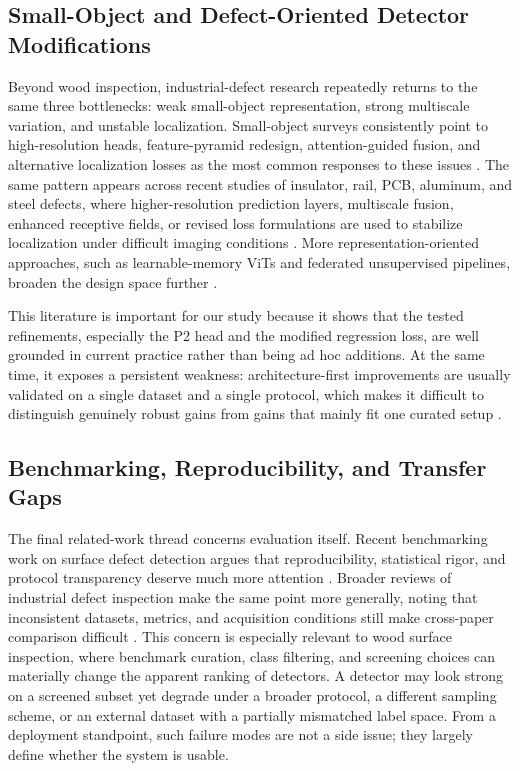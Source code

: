 \subsection{Small-Object and Defect-Oriented Detector Modifications}

Beyond wood inspection, industrial-defect research repeatedly returns to the same three bottlenecks: weak small-object representation, strong multiscale variation, and unstable localization. Small-object surveys consistently point to high-resolution heads, feature-pyramid redesign, attention-guided fusion, and alternative localization losses as the most common responses to these issues \citep{wei_2024_smallreview,hua_2025_smallsurvey}. The same pattern appears across recent studies of insulator, rail, PCB, aluminum, and steel defects, where higher-resolution prediction layers, multiscale fusion, enhanced receptive fields, or revised loss formulations are used to stabilize localization under difficult imaging conditions \citep{cmc_insulator_small,cmc_yolovsi,cmc_cg_yolov8,cmc_pcb_yolov8,cmc_aluminum_yolov8n,cmc_msese}. More representation-oriented approaches, such as learnable-memory ViTs and federated unsupervised pipelines, broaden the design space further \citep{cmc_lmvit,cmc_flame}.

This literature is important for our study because it shows that the tested refinements, especially the P2 head and the modified regression loss, are well grounded in current practice rather than being ad hoc additions. At the same time, it exposes a persistent weakness: architecture-first improvements are usually validated on a single dataset and a single protocol, which makes it difficult to distinguish genuinely robust gains from gains that mainly fit one curated setup \citep{bpn_yolo,sim_yolo,fdd_yolo,an_cwb_yolov8}.

\subsection{Benchmarking, Reproducibility, and Transfer Gaps}

The final related-work thread concerns evaluation itself. Recent benchmarking work on surface defect detection argues that reproducibility, statistical rigor, and protocol transparency deserve much more attention \citep{defect_benchmark_rigorous}. Broader reviews of industrial defect inspection make the same point more generally, noting that inconsistent datasets, metrics, and acquisition conditions still make cross-paper comparison difficult \citep{ma_2024_air,wang_2025_ieeeaccess}. This concern is especially relevant to wood surface inspection, where benchmark curation, class filtering, and screening choices can materially change the apparent ranking of detectors. A detector may look strong on a screened subset yet degrade under a broader protocol, a different sampling scheme, or an external dataset with a partially mismatched label space. From a deployment standpoint, such failure modes are not a side issue; they largely define whether the system is usable.

